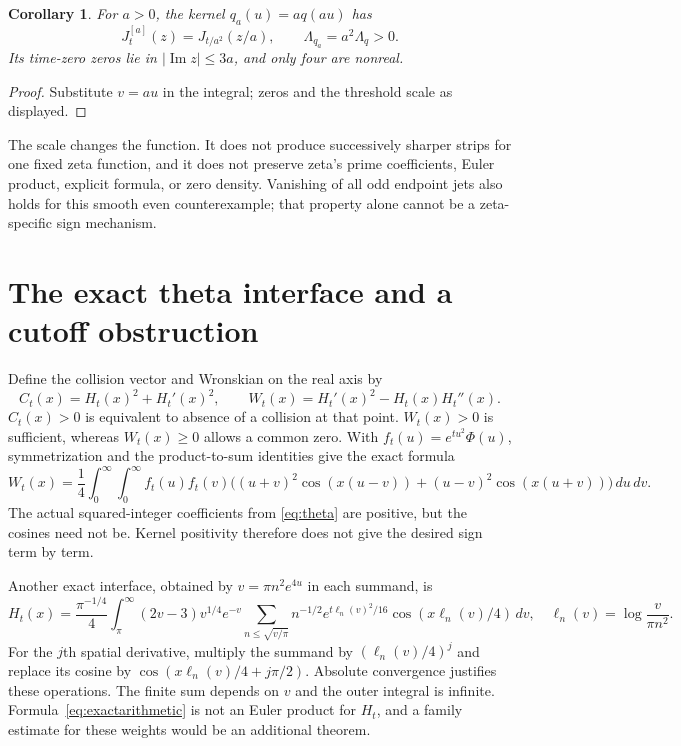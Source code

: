 \documentclass[11pt]{article}
\numberwithin{equation}{section}
\newtheorem{corollary}[theorem]{Corollary}
\theoremstyle{definition}
\theoremstyle{remark}
\DeclareMathOperator{\Ima}{Im}
\newcommand{\dd}{\,d}
\begin{document}
\begin{corollary}\label{cor:rescale}
For $a>0$, the kernel $q_a(u)=a q(au)$ has
\[
 J_t^{[a]}(z)=J_{t/a^2}(z/a),\qquad
 \Lambda_{q_a}=a^2\Lambda_q>0.
\]
Its time-zero zeros lie in $|\Ima z|\le3a$, and only four are nonreal.
\end{corollary}
\begin{proof}
Substitute $v=au$ in the integral; zeros and the threshold scale as
displayed.
\end{proof}
The scale changes the function. It does not produce successively sharper
strips for one fixed zeta function, and it does not preserve zeta's prime
coefficients, Euler product, explicit formula, or zero density.
Vanishing of all odd endpoint jets also holds for this smooth even
counterexample; that property alone cannot be a zeta-specific sign
mechanism.

\section{The exact theta interface and a cutoff obstruction}
\label{sec:theta}
Define the collision vector and Wronskian on the real axis by
\[
 C_t(x)=H_t(x)^2+H_t'(x)^2,\qquad
 W_t(x)=H_t'(x)^2-H_t(x)H_t''(x).
\]
$C_t(x)>0$ is equivalent to absence of a collision at that point.
$W_t(x)>0$ is sufficient, whereas $W_t(x)\ge0$ allows a common zero.
With $f_t(u)=e^{tu^2}\Phi(u)$, symmetrization and the product-to-sum
identities give the exact formula
\begin{equation}\label{eq:wronskianintegral}
 W_t(x)=\frac14\int_0^\infty\!\int_0^\infty f_t(u)f_t(v)
 \big((u+v)^2\cos(x(u-v))+(u-v)^2\cos(x(u+v))\big)\dd u\dd v.
\end{equation}
The actual squared-integer coefficients from \eqref{eq:theta} are
positive, but the cosines need not be. Kernel positivity therefore does
not give the desired sign term by term.

Another exact interface, obtained by $v=\pi n^2e^{4u}$ in each summand,
is
\begin{equation}\label{eq:exactarithmetic}
 H_t(x)=\frac{\pi^{-1/4}}4\int_\pi^\infty (2v-3)v^{1/4}e^{-v}
 \sum_{n\le\sqrt{v/\pi}}n^{-1/2}
 e^{t\ell_n(v)^2/16}\cos(x\ell_n(v)/4)\dd v,
 \quad \ell_n(v)=\log\frac{v}{\pi n^2}.
\end{equation}
For the $j$th spatial derivative, multiply the summand by
$(\ell_n(v)/4)^j$ and replace its cosine by
$\cos(x\ell_n(v)/4+j\pi/2)$. Absolute convergence justifies these
operations. The finite sum depends on $v$ and the outer integral is
infinite. Formula~\eqref{eq:exactarithmetic} is not an Euler product for
$H_t$, and a family estimate for these weights would be an additional
theorem.
\end{document}

